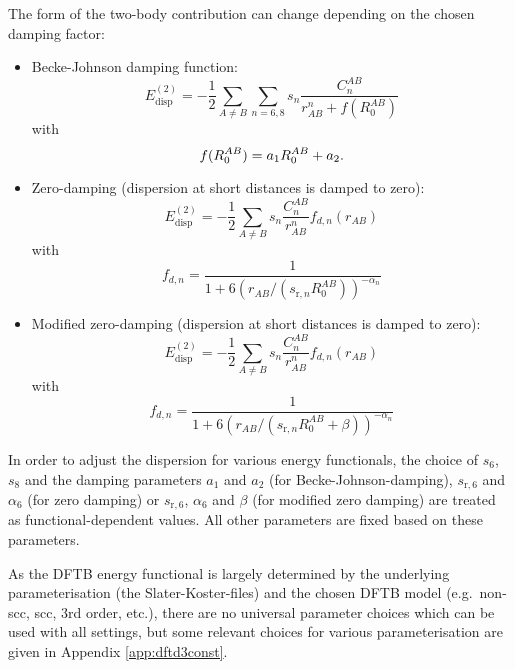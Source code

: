 The form of the two-body contribution can change depending on the chosen damping
factor:
\begin{itemize}
\item Becke-Johnson damping function:
  \begin{equation*}
    E_{\text{disp}}^{(2)} = -\frac{1}{2} \sum_{A\neq B} \sum_{n=6,8} s_n
    \frac{C_n^{AB}}{r_{AB}^n + f(R_0^{AB})}
  \end{equation*}
  with
  \begin{equation*}
    f(R_0^{AB}) = a_1 R_0^{AB} + a_2 \text.
  \end{equation*}

\item Zero-damping (dispersion at short distances is damped to zero):
  \begin{equation*}
    E_{\text{disp}}^{(2)} = -\frac{1}{2} \sum_{A \neq B} s_n
    \frac{C_n^{AB}}{r_{AB}^n} f_{d,n}(r_{AB})
  \end{equation*}
  with
  \begin{equation*}
    f_{d,n} = \frac{1}{1 + 6(r_{AB}/(s_{\text{r},n} R_0^{AB}))^{-\alpha_n}}
  \end{equation*}

\item Modified zero-damping (dispersion at short distances is damped to zero):
  \begin{equation*}
    E_{\text{disp}}^{(2)} = -\frac{1}{2} \sum_{A \neq B} s_n
    \frac{C_n^{AB}}{r_{AB}^n} f_{d,n}(r_{AB})
  \end{equation*}
  with
  \begin{equation*}
    f_{d,n} = \frac{1}{1 + 6(r_{AB}/(s_{\text{r},n} R_0^{AB} + \beta))^{-\alpha_n}}
  \end{equation*}
\end{itemize}

In order to adjust the dispersion for various energy functionals, the choice of
$s_6$, $s_8$ and the damping parameters $a_1$ and $a_2$ (for
Becke-Johnson-damping), $s_{\text{r},6}$ and $\alpha_6$ (for zero damping)
or $s_{\text{r},6}$, $\alpha_6$ and $\beta$ (for modified zero damping) are
treated as functional-dependent values. All other parameters are fixed based on
these parameters.

As the DFTB energy functional is largely determined by the underlying
parameterisation (the Slater-Koster-files) and the chosen DFTB model (e.g.\
non-scc, scc, 3rd order, etc.), there are no universal parameter choices which
can be used with all settings, but some relevant choices for various
parameterisation are given in Appendix \ref{app:dftd3const}.

